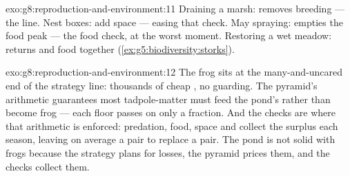 \begin{solution}{exo:g8:reproduction-and-environment:11}
Draining a marsh: removes breeding  --- the
 line. Nest boxes: add space --- easing that
check. May spraying: empties the food peak --- the food
check, at the worst moment. Restoring a wet meadow:
returns  and food together
(\cref{ex:g5:biodiversity:storks}).
\end{solution}

\begin{solution}{exo:g8:reproduction-and-environment:12}
The frog sits at the many-and-uncared end of the strategy
line: thousands of cheap , no guarding. The pyramid's
arithmetic guarantees most tadpole-matter must feed the
pond's  rather than become frog --- each floor
passes on only a fraction. And the checks are where that
arithmetic is enforced: predation, food, space and
 collect the surplus each season, leaving on
average a pair to replace a pair. The pond is not solid
with frogs because the strategy plans for losses, the
pyramid prices them, and the checks collect them.
\end{solution}

